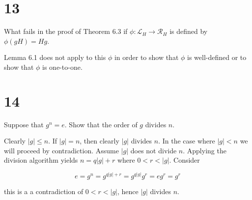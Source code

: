 \documentclass[a4paper]{article}
\begin{document}
\section*{13}

What fails in the proof of Theorem 6.3 if $\phi : \mathcal{L}_H \rightarrow \mathcal{R}_H$ is defined by $\phi(gH) = Hg$.

\vspace{\baselineskip}

Lemma 6.1 does not apply to this $\phi$ in order to show that $\phi$ is well-defined or to show that $\phi$ is one-to-one.


\section*{14}

Suppose that $g^n = e$. Show that the order of $g$ divides $n$.

\vspace{\baselineskip}

Clearly $|g| \leq n$. If $|g| = n$, then clearly $|g|$ divides $n$. In the case where $|g| < n$ we will proceed by contradiction. Assume $|g|$ does not divide $n$. Applying the division algorithm yields $n = q|g| + r$ where $0 < r < |g|$. Consider

$$e = g^n = g^{q|g| + r} = g^{q|g|}g^r = eg^r = g^r$$

this is a a contradiction of $0 < r < |g|$, hence $|g|$ divides $n$.
\end{document}
